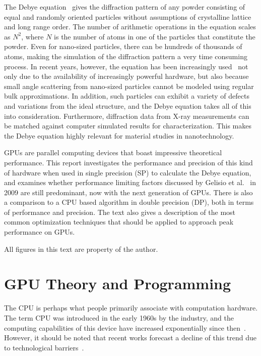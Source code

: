 \documentclass[11pt,twoside]{report}
\begin{document}
\indent The Debye equation~\cite{debyeformula} gives the diffraction pattern of any powder consisting of equal and randomly oriented particles without assumptions of crystalline lattice and long range order. The number of arithmetic operations in the equation scales as $N^{2}$, where $N$ is the number of atoms in one of the particles that constitute the powder. Even for nano-sized particles, there can be hundreds of thousands of atoms, making the simulation of the diffraction pattern a very time consuming process. In recent years, however, the equation has been increasingly used~\cite{thelol,Longo:ks5171,Cervellino:ks0165,hall:414,ISI:000277392600034} not only due to the availability of increasingly powerful hardware, but also because small angle scattering from nano-sized particles cannot be modeled using regular bulk approximations. In addition, such particles can exhibit a variety of defects and variations from the ideal structure, and the Debye equation takes all of this into consideration. Furthermore, diffraction data from X-ray measurements can be matched against computer simulated results for characterization. This makes the Debye equation highly relevant for material studies in nanotechnology.


\indent GPUs are parallel computing devices that boast impressive theoretical performance. This report investigates the performance and precision of this kind of hardware when used in single precision (SP) to calculate the Debye equation, and examines whether performance limiting factors discussed by Gelisio et al.~\cite{ISI:000277392600034} in 2009 are still predominant, now with the next generation of GPUs. There is also a comparison to a CPU based  algorithm in double precision (DP), both in terms of performance and precision. The text also gives a description of the most common optimization techniques that should be applied to approach peak performance on GPUs.


All figures in this text are property of the author.


\chapter{GPU Theory and Programming}
The CPU is perhaps what people primarily associate with computation hardware. The term CPU was introduced in the early 1960s by the industry, and the computing capabilities of this device have increased exponentially since then~\cite{Moore}. However, it should be noted that recent works forecast a decline of this trend due to technological barriers~\cite{springerlink:10.1134/S1063783407010246,4567410}.  
\end{document}
